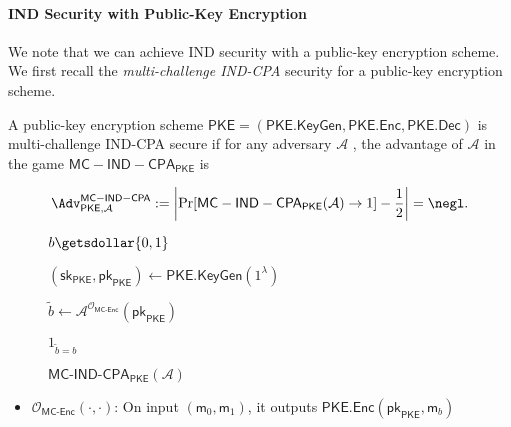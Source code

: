 \paragraph{IND Security with Public-Key Encryption}

We note that we can achieve IND security with a public-key encryption scheme. We first recall the \emph{multi-challenge IND-CPA} security for a public-key encryption scheme.

\begin{definition}

A public-key encryption scheme $\mathsf{PKE} = (\mathsf{PKE.KeyGen}, \mathsf{PKE.Enc}, \mathsf{PKE.Dec})$ is multi-challenge IND-CPA secure if for any adversary $\mathcal{A}$ , the advantage of $\mathcal{A}$ in the game $\mathsf{MC-IND-CPA}_{\mathsf{PKE}}$ is

\[
	\Adv^{\mathsf{MC-IND-CPA}}_{\mathsf{PKE}, \mathcal{A}} := \left| \Pr[ \mathsf{MC-IND-CPA}_{\mathsf{PKE}}(\mathcal{A}) \to 1 ] - \frac{1}{2} \right| = \negl.
\]

\begin{figure}[h]
\centering

	\begin{minipage}[t]{0.6\textwidth}
	\begin{algorithm}[H]
	\caption{$\textsf{MC-IND-CPA}_{\mathsf{PKE}} (\mathcal{A})$ }
	\label{alg:MC-IND-CPA}
	\begin{algorithmic}[1]
		\State $b \getsdollar \{0, 1\}$

		\State $(\mathsf{sk}_{\mathsf{PKE}}, \mathsf{pk}_{\mathsf{PKE}}) \gets \mathsf{PKE.KeyGen}(1^\lambda)$
		
		\State $\tilde{b} \gets \mathcal{A}^{\mathcal{O}_{\textsf{MC-Enc}}}(\mathsf{pk}_{\mathsf{PKE}})$ 
		
		\State \Return $1_{\tilde{b} = b}$
	\end{algorithmic}
	\end{algorithm}
	\end{minipage}

\end{figure}
\end{definition}

\begin{itemize}
	\item $\mathcal{O}_{\textsf{MC-Enc}}(\cdot, \cdot)$: On input $(\mathsf{m}_0, \mathsf{m}_1)$, it outputs $\mathsf{PKE.Enc}(\mathsf{pk}_{\mathsf{PKE}}, \mathsf{m}_b)$
\end{itemize}

